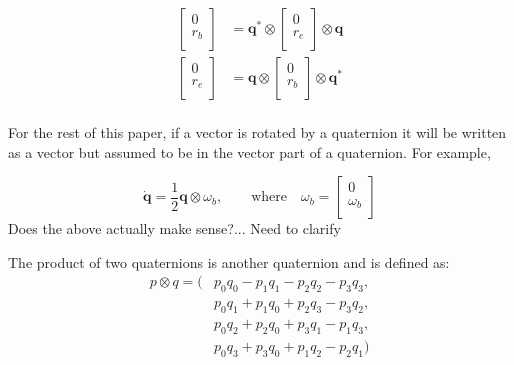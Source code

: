 \documentclass{article}
\numberwithin{equation}{section} %
\newcommand{\bs}[1]{\boldsymbol{#1}}
\begin{document}
\begin{align}
	\begin{bmatrix}
		0 \\
		r_b \\
	\end{bmatrix}
	&=
	\bs{q}^* \otimes 
	\begin{bmatrix}
		0 \\
		r_e \\
	\end{bmatrix}
	\otimes \bs{q}	\\
	\begin{bmatrix}
		0 \\
		r_e \\
	\end{bmatrix}
	&=
	\bs{q} \otimes 
	\begin{bmatrix}
		0 \\
		r_b \\
	\end{bmatrix}
	\otimes \bs{q}^*	\\	
\end{align}	
		
For the rest of this paper, if a vector is rotated by a quaternion it will  be written as a vector but assumed to be in the vector part of a quaternion. For example,

\begin{equation}
	\dot{\bs{q}} = \frac{1}{2} \bs{q} \otimes \omega_b, \qquad 	\textrm{where} \quad
	\omega_b =	
	\begin{bmatrix}
		0 \\
		\omega_b \\
	\end{bmatrix}
\end{equation}
Does the above actually make sense?... Need to clarify

The product of two quaternions is another quaternion and is defined as:
\begin{equation}
	\begin{split}
		p \otimes q =	( & p_0 q_0 - p_1 q_1 - p_2 q_2 - p_3 q_3, \\
							& p_0 q_1 + p_1 q_0 + p_2 q_3 - p_3 q_2,  \\
							& p_0 q_2 + p_2 q_0 + p_3 q_1 - p_1 q_3,  \\
							& p_0 q_3 + p_3 q_0 + p_1 q_2 - p_2 q_1 ) \\
	\end{split}
\end{equation}
\end{document}
